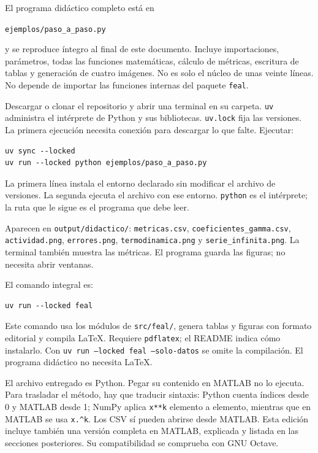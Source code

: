 El programa didáctico completo está en
\begin{center}\texttt{ejemplos/paso\_a\_paso.py}\end{center}
y se reproduce íntegro al final de este documento. Incluye importaciones, parámetros, todas las funciones matemáticas, cálculo de métricas, escritura de tablas y generación de cuatro imágenes. No es solo el núcleo de unas veinte líneas. No depende de importar las funciones internas del paquete \texttt{feal}.

Descargar o clonar el repositorio y abrir una terminal en su carpeta. \texttt{uv} administra el intérprete de Python y sus bibliotecas. \texttt{uv.lock} fija las versiones. La primera ejecución necesita conexión para descargar lo que falte. Ejecutar:
\begin{verbatim}
uv sync --locked
uv run --locked python ejemplos/paso_a_paso.py
\end{verbatim}
La primera línea instala el entorno declarado sin modificar el archivo de versiones. La segunda ejecuta el archivo con ese entorno. \texttt{python} es el intérprete; la ruta que le sigue es el programa que debe leer.

Aparecen en \texttt{output/didactico/}: \texttt{metricas.csv}, \texttt{coeficientes\_gamma.csv}, \texttt{actividad.png}, \texttt{errores.png}, \texttt{termodinamica.png} y \texttt{serie\_infinita.png}. La terminal también muestra las métricas. El programa guarda las figuras; no necesita abrir ventanas.

El comando integral es:
\begin{verbatim}
uv run --locked feal
\end{verbatim}
Este comando usa los módulos de \texttt{src/feal/}, genera tablas y figuras con formato editorial y compila LaTeX. Requiere \texttt{pdflatex}; el README indica cómo instalarlo. Con \texttt{uv run --locked feal --solo-datos} se omite la compilación. El programa didáctico no necesita LaTeX.

El archivo entregado es Python. Pegar su contenido en MATLAB no lo ejecuta. Para trasladar el método, hay que traducir sintaxis: Python cuenta índices desde 0 y MATLAB desde 1; NumPy aplica \texttt{x**k} elemento a elemento, mientras que en MATLAB se usa \texttt{x.\^{}k}. Los CSV sí pueden abrirse desde MATLAB. Esta edición incluye también una versión completa en MATLAB, explicada y listada en las secciones posteriores. Su compatibilidad se comprueba con GNU Octave.

